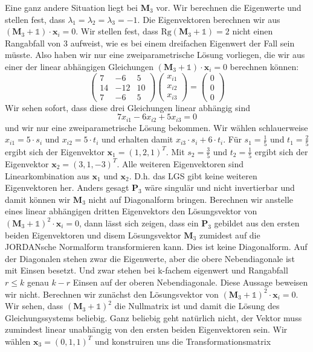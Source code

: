 Eine ganz andere Situation liegt bei $\mathbf{M}_3$ vor. Wir berechnen die Eigenwerte und stellen fest, dass $\lambda_1=\lambda_2=\lambda_3=-1$.
Die Eigenvektoren berechnen wir aus  $(\mathbf{M}_3+\mathds{1})\cdot\mathbf{x}_i=0$. Wir stellen fest, dass $\text{Rg}(\mathbf{M}_3+\mathds{1})=2$ nicht einen Rangabfall von 3 aufweist, wie es bei einem dreifachen Eigenwert der Fall sein müsste. Also haben wir nur eine zweiparametrische Lösung vorliegen, die wir aus einer der linear abhängigen Gleichungen $(\mathbf{M}_3+\mathds{1})\cdot\mathbf{x}_i=0$ berechnen können:
\[
\begin{pmatrix}7&-6&5\\ 14&-12&10\\ 7&-6&5\end{pmatrix}
\begin{pmatrix}x_{i1}\\ x_{i2}\\ x_{i3}\end{pmatrix}=
\begin{pmatrix}0\\ 0\\ 0\end{pmatrix}
\]
Wir sehen sofort, dass diese drei Gleichungen linear abhängig sind 
\[ 7x_{i1}-6x_{i2}+5x_{i3}=0\]
und wir nur eine zweiparametrische Lösung bekommen. Wir wählen schlauerweise $x_{i1}=5\cdot s_i$ und $x_{i2}=5\cdot t_i$ und erhalten damit $x_{i3}\cdot s_i+6\cdot t_i$. Für $s_1=\frac{1}{5}$ und $t_1=\frac{2}{5}$ ergibt sich der Eigenvektor $\mathbf{x}_1=(1,2,1)^T$. Mit $s_2=\frac{3}{5}$ und $t_2=\frac{1}{5}$ ergibt sich der Eigenvektor $\mathbf{x}_2=(3,1,-3)^T$. Alle weiteren Eigenvektoren sind Linearkombination aus $\mathbf{x}_1$ und $\mathbf{x}_2$. D.h. das LGS gibt keine weiteren Eigenvektoren her. Anders gesagt $\mathbf{P}_3$ wäre singulär und nicht invertierbar und damit können wir $\mathbf{M}_3$ nicht auf Diagonalform bringen. Berechnen wir anstelle eines linear abhängigen dritten Eigenvektors den Lösungsvektor von $(\mathbf{M}_3+\mathds{1})^2\cdot\mathbf{x}_i=0$, dann lässt sich zeigen, dass ein $\mathbf{P}_3$ gebildet aus den ersten beiden Eigenvektoren und disem Lösungsvektor $\mathbf{M}_3$ zumidest auf die JORDANsche Normalform transformieren kann. Dies ist keine Diagonalform. Auf der Diagonalen stehen zwar die Eigenwerte, aber die obere Nebendiagonale ist mit Einsen besetzt. Und zwar stehen bei k-fachem eigenwert und Rangabfall $r\le k$ genau $k-r$ Einsen auf der oberen Nebendiagonale. Diese Aussage beweisen wir nicht. Berechnen wir zunächst den Lösungsvektor von $(\mathbf{M}_3+\mathds{1})^2\cdot\mathbf{x}_i=0$. Wir sehen, dass $(\mathbf{M}_3+\mathds{1})^2$ die Nullmatrix ist und damit die Lösung des Gleichungssystems beliebig. Ganz beliebig geht natürlich nicht, der Vektor muss zumindest linear unabhängig von den ersten beiden Eigenvektoren sein. Wir wählen $\mathbf{x}_3=(0,1,1)^T$ und konstruiren uns die Transformationsmatrix
